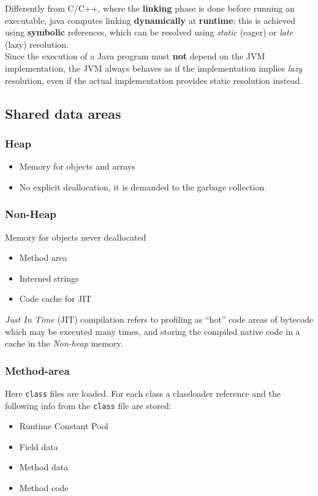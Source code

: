 Differently from C/C++, where the \textbf{linking} phase is done before running an executable,
java computes linking \textbf{dynamically} at \textbf{runtime};
this is achieved using \textbf{symbolic} references, which can be resolved using \textit{static} (eager) or \textit{late} (lazy) resolution.\\
Since the execution of a Java program must \textbf{not} depend on the JVM implementation, the JVM always behaves as if the implementation implies \textit{lazy} resolution, 
even if the actual implementation provides static resolution instead.

\subsection{Shared data areas}
\subsubsection{Heap}
\begin{itemize}
    \item Memory for objects and arrays
    \item No explicit deallocation, it is demanded to the garbage collection.
\end{itemize}

\subsubsection{Non-Heap}
Memory for objects never deallocated
\begin{itemize}
    \item Method area
    \item Interned strings
    \item Code cache for JIT
\end{itemize}

\textit{Just In Time} (JIT) compilation refers to profiling as ``hot'' code areas of bytecode which may be executed many times, and storing the compiled native code in a cache in the \textit{Non-heap} memory.

\subsubsection{Method-area}
Here \lstinline{class} files are loaded.
For each class a classloader reference and the following info from the \lstinline{class} file are stored:
\begin{itemize}
    \item Runtime Constant Pool
    \item Field data
    \item Method data
    \item Method code
\end{itemize}

